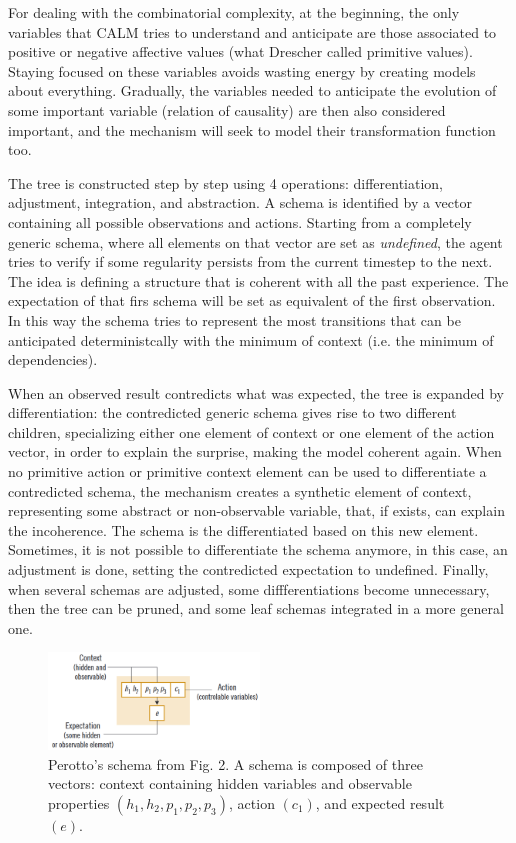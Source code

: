\documentclass[runningheads]{llncs}
\begin{document}
For dealing with the combinatorial complexity, at the beginning, the only variables that CALM tries to understand and anticipate are those associated to positive or negative affective values (what Drescher called primitive values). Staying focused on these variables avoids wasting energy by creating models about everything. Gradually,
the variables needed to anticipate the evolution of some important variable (relation of causality) are then also considered important, and the mechanism will seek to model their
transformation function too.

The tree is constructed step by step using 4 operations: differentiation, adjustment, integration, and abstraction.
A schema is identified by a vector containing all possible observations and actions. 
Starting from a completely generic schema, where all elements on that vector are set as \textit{undefined}, the agent tries to verify if some regularity persists from the current timestep to the next.
The idea is defining a structure that is coherent with all the past experience.
The expectation of that firs schema will be set as equivalent of the first observation. 
In this way the schema tries to represent the most transitions that can be anticipated deterministcally with the minimum of context (i.e. the minimum of dependencies).

When an observed result contredicts what was expected, the tree is expanded by differentiation: the contredicted generic schema gives rise to two different children, specializing either one element of context or one element of the action vector, in order to explain the surprise, making the model coherent again.
When no primitive action or primitive context element can be used to differentiate a contredicted schema, the mechanism creates a synthetic element of context, representing some abstract or non-observable variable, that, if exists, can explain the incoherence. The schema is the differentiated based on this new element.
Sometimes, it is not possible to differentiate the schema anymore, in this case, an adjustment is done, setting the contredicted expectation to undefined.
Finally, when several schemas are adjusted, some diffferentiations become unnecessary, then the tree can be pruned, and some leaf schemas integrated in a more general one.

\begin{figure}
	\centering
	\includegraphics[width=0.5\textwidth]{Figure_perotto.png}
	\caption{Perotto's schema from \cite{Perotto:2013:CF} Fig. 2.
		A schema is composed of three vectors: context containing hidden variables and observable properties $(h_1, h_2, p_1, p_2, p_3)$, action $(c_1)$, and expected result $(e)$. } 
	\label{fig:perotto}
\end{figure}
\end{document}
